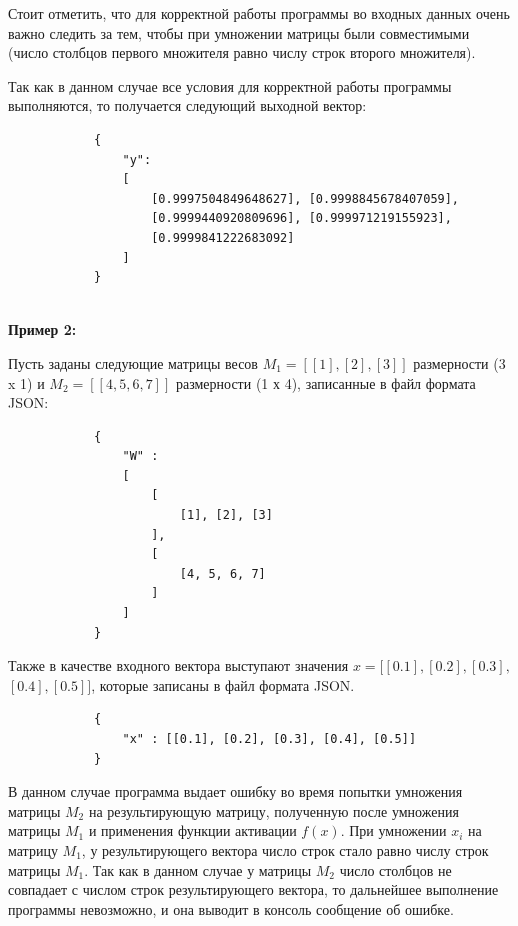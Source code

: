 \documentclass[bachelor, och, otchet]{template}
\begin{document}
        Стоит отметить, что для корректной работы программы во входных данных очень важно следить за тем, чтобы при умножении
        матрицы были совместимыми (число столбцов первого множителя равно числу строк второго множителя).
        
        Так как в данном случае все условия для корректной работы программы выполняются, то получается следующий выходной вектор:

        \begin{verbatim}
            {
                "y": 
                [
                    [0.9997504849648627], [0.9998845678407059], 
                    [0.9999440920809696], [0.999971219155923], 
                    [0.9999841222683092]
                ]
            }
            
        \end{verbatim}

        \textbf{Пример 2:}

        Пусть заданы следующие матрицы весов $M_1 = [[1], [2], [3]]$ размерности (3 x 1)
        и $M_2 = [[4, 5, 6, 7]]$ размерности (1 х 4), записанные в файл формата JSON:
        
        \begin{verbatim}
            {
                "W" : 
                [
                    [
                        [1], [2], [3]
                    ], 
                    [
                        [4, 5, 6, 7]
                    ]
                ]
            }
        \end{verbatim}

        Также в качестве входного вектора выступают значения $x = [[0.1], [0.2], [0.3],$ \\$[0.4], [0.5]]$, 
        которые записаны в файл формата JSON.

        \begin{verbatim}
            {
                "x" : [[0.1], [0.2], [0.3], [0.4], [0.5]]
            }
        \end{verbatim}

        В данном случае программа выдает ошибку во время попытки умножения матрицы $M_2$ на результирующую матрицу,
        полученную после умножения матрицы $M_1$ и применения функции активации $f(x)$. При умножении $x_i$ на матрицу $M_1$,
        у результирующего вектора число строк стало равно числу строк матрицы $M_1$. Так как в данном случае у матрицы $M_2$ число
        столбцов не совпадает с числом строк результирующего вектора, то дальнейшее выполнение программы невозможно, и она выводит 
        в консоль сообщение об ошибке.
\end{document}
